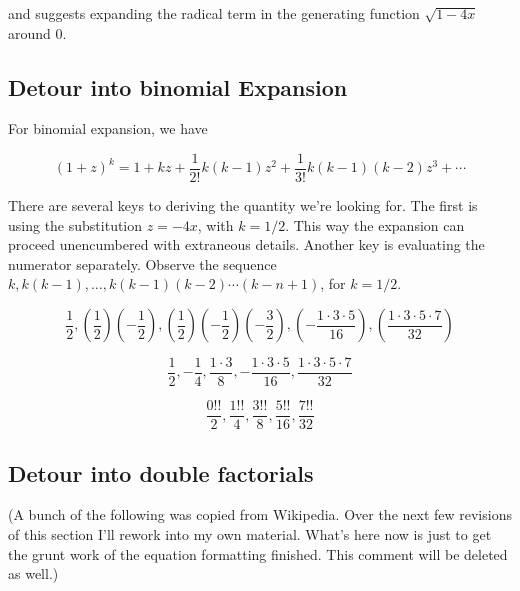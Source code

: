 \documentclass{article}
\begin{document}
and suggests expanding the radical term in the generating function
$\sqrt{1-4x}$ around $0$.



\subsection{Detour into binomial Expansion}

For binomial expansion, we have

\begin{equation}
  (1 + z)^k = 1 + kz + \frac{1}{2!}k(k - 1)z^2 + \frac{1}{3!}k(k - 1)(k - 2)z^3 + \cdots
\end{equation}

There are several keys to deriving the quantity we're looking for.
The first is using the substitution $z = -4x$, with $k = 1/2$. This way the expansion
can proceed unencumbered with extraneous details. Another key is evaluating the
numerator separately. Observe the sequence $k, k(k-1),\dots, k(k - 1)(k - 2)\cdots(k - n + 1)$,
for $k = 1/2$.

\begin{equation}
  \frac{1}{2},
  \left(\frac{1}{2}\right)\left(-\frac{1}{2}\right),
  \left(\frac{1}{2}\right)\left(-\frac{1}{2}\right)\left(-\frac{3}{2}\right),
  \left(-\frac{1\cdot3\cdot5}{16}\right),
  \left(\frac{1\cdot3\cdot5\cdot7}{32}\right)
\end{equation}

\begin{equation}
  \frac{1}{2},
  -\frac{1}{4},
  \frac{1\cdot3}{8},
  -\frac{1\cdot3\cdot5}{16},
  \frac{1\cdot3\cdot5\cdot7}{32}
\end{equation}

\begin{equation}
  \frac{0!!}{2},
  \frac{1!!}{4},
  \frac{3!!}{8},
  \frac{5!!}{16},
  \frac{7!!}{32}
\end{equation}

\subsection{Detour into double factorials}

(A bunch of the following was copied from Wikipedia. Over the next few
revisions of this section I'll rework into my own material. What's here
now is just to get the grunt work of the equation formatting finished.
This comment will be deleted as well.)
\end{document}
